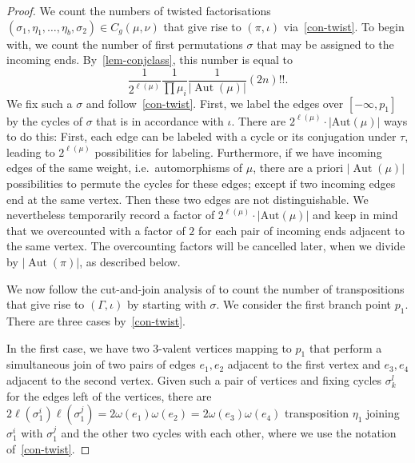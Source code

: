 \documentclass[ALCO,published]{cedram}
\DeclareMathOperator{\Aut}{Aut}
\begin{document}
\begin{proof}
We count the numbers of twisted factorisations $(\sigma_1,\eta_1,\dots,\eta_b,\sigma_2)\in C_g(\mu,\nu)$ that give rise to $(\pi,\iota)$ via~\cref{con-twist}. To begin with, we count the number of first permutations $\sigma$ that may be assigned to the incoming ends. By~\cref{lem-conjclass}, this number is equal to
\begin{equation*}
    \frac{1}{2^{\ell(\mu)}} \frac{1}{\prod \mu_i} \frac{1}{|\Aut(\mu)|}(2n)!! .
\end{equation*}
We fix such a $\sigma$  and follow~\cref{con-twist}. First, we label the edges over $[-\infty,p_1]$ by the cycles of $\sigma$ that is in accordance with $\iota$. There are $2^{\ell(\mu)}\cdot |\mathrm{Aut}(\mu)|$ ways to do this: 
First, each edge can be labeled with a cycle or its conjugation under $\tau$, leading to $2^{\ell(\mu)}$ possibilities for labeling.
Furthermore, if we have incoming edges of the same weight, i.e.\ automorphisms of $\mu$, there are a priori $|\Aut(\mu)|$ possibilities to permute the cycles for these edges; except if two incoming edges end at the same vertex. Then these two edges are not distinguishable. We nevertheless temporarily record a factor of $2^{\ell(\mu)}\cdot |\mathrm{Aut}(\mu)|$ and keep in mind that we overcounted with a factor of $2$ for each pair  of incoming ends adjacent to the same vertex. The overcounting factors will be cancelled later, when we divide by $|\Aut(\pi)|$, as described below.

We now follow the cut-and-join analysis of \cite[Theorem 2.12]{BF21} to count the number of transpositions that give rise to $(\Gamma,\iota)$ by starting with $\sigma$. We consider the first branch point $p_1$. There are three cases by~\cref{con-twist}.

In the first case, we have two $3$-valent vertices mapping to $p_1$ that perform a simultaneous join of two pairs of edges $e_1,e_2$ adjacent to the first vertex and $e_3,e_4$ adjacent to the second vertex. Given such a pair of vertices and fixing cycles $\sigma_k^l$ for the edges left of the vertices, there are $2\ell(\sigma_1^i)\ell(\sigma_1^j)=2\omega(e_1)\omega(e_2)= 2\omega(e_3)\omega(e_4)$ transposition $\eta_1$ joining $\sigma_1^i$ with $\sigma_1^j$ and the other two cycles with each other, where we use the notation of~\cref{con-twist}.


\end{proof}
\end{document}

